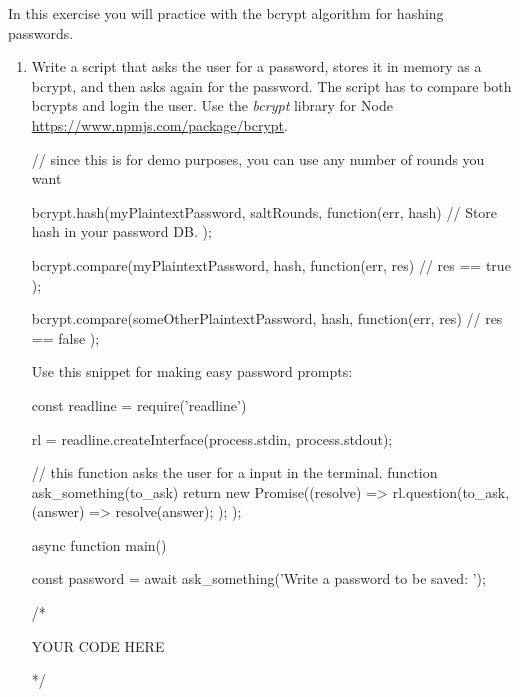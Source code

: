 \begin{Exercise}[label={basic-js-crypto-bcrypt}]
In this exercise you will practice with the bcrypt algorithm for hashing passwords.

\begin{enumerate}[1.]
\item Write a script that asks the user for a password, stores it in memory as a bcrypt, and then asks again for the password. The script has to compare both bcrypts and login the user. Use the \textit{bcrypt} library for Node \url{https://www.npmjs.com/package/bcrypt}.

\begin{js}
// since this is for demo purposes, you can use any number of rounds you want

bcrypt.hash(myPlaintextPassword, saltRounds, function(err, hash) {
// Store hash in your password DB.
});

bcrypt.compare(myPlaintextPassword, hash, function(err, res) {
// res == true
});

bcrypt.compare(someOtherPlaintextPassword, hash, function(err, res) {
// res == false
});
\end{js}

Use this snippet for making easy password prompts:
\begin{js}
  
const readline = require('readline')

rl = readline.createInterface(process.stdin, process.stdout);
  
// this function asks the user for a input in the terminal.
function ask_something(to_ask) {
  return new Promise((resolve) => {
    rl.question(to_ask, (answer) => {
      resolve(answer);
    });
  });
}

async function main() {
  const password = await ask_something('Write a password to be saved: ');
  
  /*
  
  YOUR CODE HERE
  
  */
}
\end{js}
\end{enumerate}
\end{Exercise}

